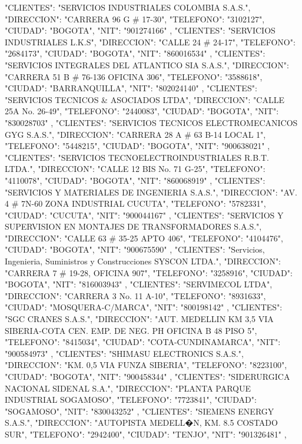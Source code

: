    {
   "CLIENTES": "SERVICIOS INDUSTRIALES COLOMBIA S.A.S.",
   "DIRECCION": "CARRERA 96 G # 17-30",
   "TELEFONO": "3102127",
   "CIUDAD": "BOGOTA",
   "NIT": "901274166"
   },
   {
   "CLIENTES": "SERVICIOS INDUSTRIALES L.K.S",
   "DIRECCION": "CALLE 24 # 24-17",
   "TELEFONO": "2684173",
   "CIUDAD": "BOGOTA",
   "NIT": "860016534"
   },
   {
   "CLIENTES": "SERVICIOS INTEGRALES DEL ATLANTICO SIA S.A.S.",
   "DIRECCION": "CARRERA 51 B # 76-136 OFICINA 306",
   "TELEFONO": "3588618",
   "CIUDAD": "BARRANQUILLA",
   "NIT": "802024140"
   },
   {
   "CLIENTES": "SERVICIOS TECNICOS & ASOCIADOS LTDA",
   "DIRECCION": "CALLE 25A No. 26-49",
   "TELEFONO": "2440083",
   "CIUDAD": "BOGOTA",
   "NIT": "830028703"
   },
   {
   "CLIENTES": "SERVICIOS TECNICOS ELECTROMECANICOS GYG S.A.S.",
   "DIRECCION": "CARRERA 28 A # 63 B-14 LOCAL 1",
   "TELEFONO": "5448215",
   "CIUDAD": "BOGOTA",
   "NIT": "900638021"
   },
   {
   "CLIENTES": "SERVICIOS TECNOELECTROINDUSTRIALES R.B.T. LTDA.",
   "DIRECCION": "CALLE 12 BIS No. 71 G-25",
   "TELEFONO": "4110078",
   "CIUDAD": "BOGOTA",
   "NIT": "860068919"
   },
   {
   "CLIENTES": "SERVICIOS Y MATERIALES DE INGENIERIA S.A.S.",
   "DIRECCION": "AV. 4 # 7N-60 ZONA INDUSTRIAL CUCUTA",
   "TELEFONO": "5782331",
   "CIUDAD": "CUCUTA",
   "NIT": "900044167"
   },
   {
   "CLIENTES": "SERVICIOS Y SUPERVISION EN MONTAJES DE TRANSFORMADORES S.A.S.",
   "DIRECCION": "CALLE 63 # 35-25 APTO 406",
   "TELEFONO": "4104476",
   "CIUDAD": "BOGOTA",
   "NIT": "900675590"
   },
   {
   "CLIENTES": "Servicios, Ingenieria, Suministros y Construcciones SYSCON LTDA.",
   "DIRECCION": "CARRERA 7 # 19-28, OFICINA 907",
   "TELEFONO": "3258916",
   "CIUDAD": "BOGOTA",
   "NIT": "816003943"
   },
   {
   "CLIENTES": "SERVIMECOL LTDA",
   "DIRECCION": "CARRERA 3 No. 11 A-10",
   "TELEFONO": "8931633",
   "CIUDAD": "MOSQUERA-C/MARCA",
   "NIT": "800198142"
   },
   {
   "CLIENTES": "SGC CRANES S.A.S.",
   "DIRECCION": "AUT. MEDELLIN KM 3,5 VIA SIBERIA-COTA CEN. EMP. DE NEG. PH OFICINA B 48 PISO 5",
   "TELEFONO": "8415034",
   "CIUDAD": "COTA-CUNDINAMARCA",
   "NIT": "900584973"
   },
   {
   "CLIENTES": "SHIMASU ELECTRONICS S.A.S.",
   "DIRECCION": "KM. 0,5 VIA FUNZA SIBERIA",
   "TELEFONO": "8223100",
   "CIUDAD": "BOGOTA",
   "NIT": "900458344"
   },
   {
   "CLIENTES": "SIDERURGICA NACIONAL SIDENAL S.A.",
   "DIRECCION": "PLANTA PARQUE INDUSTRIAL SOGAMOSO",
   "TELEFONO": "7723841",
   "CIUDAD": "SOGAMOSO",
   "NIT": "830043252"
   },
   {
   "CLIENTES": "SIEMENS ENERGY S.A.S.",
   "DIRECCION": "AUTOPISTA MEDELL�N, KM. 8.5 COSTADO SUR",
   "TELEFONO": "2942400",
   "CIUDAD": "TENJO",
   "NIT": "901326481"
   },
